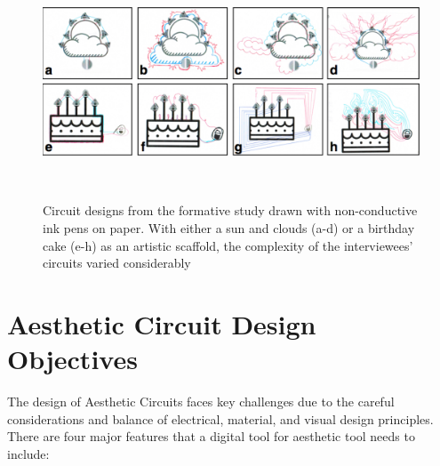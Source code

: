 \documentclass{sigchi}
\begin{document}
\begin{figure}
\centering
  \includegraphics[width=1\columnwidth]{figures/Ellustrate_figures_formative_user_design}
  \caption{Circuit designs from the formative study drawn with non-conductive ink pens on paper. With either a sun and clouds (a-d) or a birthday cake (e-h) as an artistic scaffold, the complexity of the interviewees' circuits varied considerably }~\label{fig:formative_user_design}
  \vspace{-16pt}
\end{figure}

\section{Aesthetic Circuit Design Objectives}

The design of Aesthetic Circuits faces key challenges due to the careful considerations and balance of electrical, material, and visual design principles. There are four major features that a digital tool for aesthetic tool needs to include: 
\end{document}
